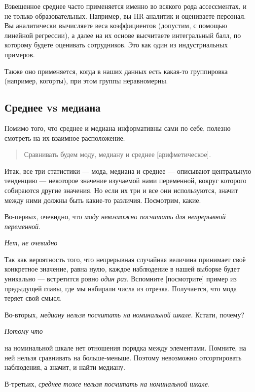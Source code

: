 \documentclass[
  letterpaper,
]{scrbook}
\theoremstyle{definition}
\theoremstyle{remark}
\begin{document}
Взвещенное среднее часто применяется именно во всякого рода
ассессментах, и не только образовательных. Например, вы HR-аналитик и
оцениваете персонал. Вы аналитически вычисляете веса коэффициентов
(допустим, с помощью линейной регрессии), а далее на их основе
высчитаете интегральный балл, по которому будете оценивать сотрудников.
Это как один из индустриальных примеров.

Также оно применяется, когда в наших данных есть какая-то группировка
(например, когорты), при этом группы неравномерны.

\subsection{Среднее vs медиана}\label{andan-descriptives-mean-vs-median}

Помимо того, что среднее и медиана информативны сами по себе, полезно
смотреть на их взаимное расположение.

\begin{quote}
Сравнивать будем моду, медиану и среднее {[}арифметическое{]}.
\end{quote}

Итак, все три статистики --- мода, медиана и среднее --- описывают
центральную тенденцию --- некоторое значение изучаемой нами переменной,
вокруг которого собираются другие значения. Но если их три и все они
используются, значит между ними должны быть какие-то различия.
Посмотрим, какие.

Во-первых, очевидно, что \emph{моду невозможно посчитать для непрерывной
переменной}.

\emph{Нет, не очевидно}

Так как вероятность того, что непрерывная случайная величина принимает
своё конкретное значение, равна нулю, каждое наблюдение в нашей выборке
будет уникально --- встретится ровно \emph{один раз}. Вспомните
{[}посмотрите{]} пример из предыдущей главы, где мы набирали числа из
отрезка. Получается, что мода теряет свой смысл.

Во-вторых, \emph{медиану нельзя посчитать на номинальной шкале}. Кстати,
почему?

\emph{Потому что}

на номинальной шкале нет отношения порядка между элементами. Помните, на
ней нельзя сравнивать на больше-меньше. Поэтому невозможно отсортировать
наблюдения, а значит, и найти медиану.

В-третьих, \emph{среднее тоже нельзя посчитать на номинальной шкале}.
\end{document}
